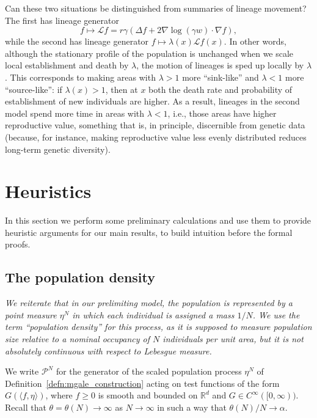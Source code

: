\documentclass[12pt]{article}
\newcommand{\IR}{\mathbb R}
\newcommand{\grad}{\nabla}
\newcommand{\Lgen}{\mathcal{L}}    %
\newcommand{\Pgen}{\mathcal{P}}    %
\numberwithin{equation}{section}
\begin{document}
Can these two situations be distinguished from summaries of lineage movement?
The first has lineage generator
\[
    f \mapsto \Lgen f = r \gamma \left( \Delta f + 2 \grad \log(\gamma w) \cdot \grad f \right),
\]
while the second has lineage generator $f \mapsto \lambda(x) \Lgen f(x)$.
In other words,
although the stationary profile of the population is unchanged when we scale
local establishment and death by $\lambda$,
the motion of lineages is sped up locally by $\lambda$.
This corresponds to making areas with $\lambda > 1$ more ``sink-like'' 
and $\lambda < 1$ more ``source-like'':
if $\lambda(x) > 1$, then at $x$ both the death rate and probability of 
establishment of new individuals are higher.
As a result, lineages in the second model spend more time in areas with $\lambda < 1$,
i.e., those areas have higher reproductive value, %
something that is, in principle, discernible from genetic data
(because, for instance, making reproductive value less evenly distributed
reduces long-term genetic diversity).


\section{Heuristics}
    \label{sec:heuristics}

In this section we perform some preliminary calculations and use them 
to provide heuristic arguments for our main results,
to build intuition before the formal proofs.

\subsection{The population density}
    \label{sec:population_heuristics}

{\em We reiterate that in our prelimiting model,
the population is represented by a point measure $\eta^N$ in which each
individual is assigned a mass $1/N$. We use the term ``population density'' for
this process, as it is supposed to measure population size relative to a 
nominal occupancy of $N$ individuals per unit area, but it is not
absolutely continuous with respect to Lebesgue measure.}

We write $\Pgen^N$
for the generator of the scaled population process $\eta^N$
of Definition~\ref{defn:mgale_construction}
acting on test functions of the form $G( \langle f, \eta \rangle )$,
where $f \geq 0$ is smooth and bounded on $\IR^d$ and 
$G \in C^\infty ([0,\infty))$.
Recall that $\theta =\theta(N) \to \infty$ as $N\to\infty$ in such 
a way that $\theta(N)/N\to\alpha$.
\end{document}
